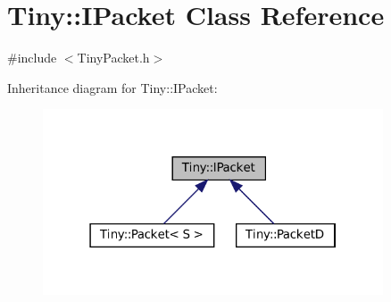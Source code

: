 \hypertarget{classTiny_1_1IPacket}{}\section{Tiny\+:\+:I\+Packet Class Reference}
\label{classTiny_1_1IPacket}


{\ttfamily \#include $<$Tiny\+Packet.\+h$>$}



Inheritance diagram for Tiny\+:\+:I\+Packet\+:\nopagebreak
\begin{figure}[H]
\begin{center}
\leavevmode
\includegraphics[width=286pt]{classTiny_1_1IPacket__inherit__graph}
\end{center}
\end{figure}
